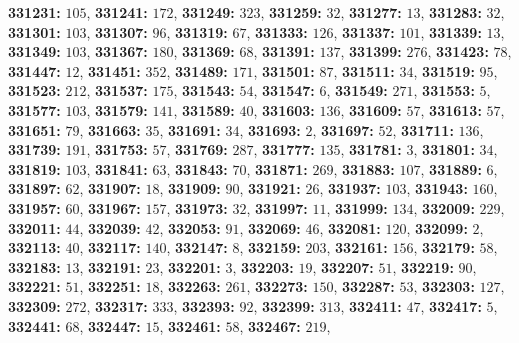 \textsf{\bfseries 331231:} $105$, \textsf{\bfseries 331241:} $172$, \textsf{\bfseries 331249:} $323$, \textsf{\bfseries 331259:} $32$, \textsf{\bfseries 331277:} $13$, \textsf{\bfseries 331283:} $32$, \textsf{\bfseries 331301:} $103$, \textsf{\bfseries 331307:} $96$, \textsf{\bfseries 331319:} $67$, \textsf{\bfseries 331333:} $126$, \textsf{\bfseries 331337:} $101$, \textsf{\bfseries 331339:} $13$, \textsf{\bfseries 331349:} $103$, \textsf{\bfseries 331367:} $180$, \textsf{\bfseries 331369:} $68$, \textsf{\bfseries 331391:} $137$, \textsf{\bfseries 331399:} $276$, \textsf{\bfseries 331423:} $78$, \textsf{\bfseries 331447:} $12$, \textsf{\bfseries 331451:} $352$, \textsf{\bfseries 331489:} $171$, \textsf{\bfseries 331501:} $87$, \textsf{\bfseries 331511:} $34$, \textsf{\bfseries 331519:} $95$, \textsf{\bfseries 331523:} $212$, \textsf{\bfseries 331537:} $175$, \textsf{\bfseries 331543:} $54$, \textsf{\bfseries 331547:} $6$, \textsf{\bfseries 331549:} $271$, \textsf{\bfseries 331553:} $5$, \textsf{\bfseries 331577:} $103$, \textsf{\bfseries 331579:} $141$, \textsf{\bfseries 331589:} $40$, \textsf{\bfseries 331603:} $136$, \textsf{\bfseries 331609:} $57$, \textsf{\bfseries 331613:} $57$, \textsf{\bfseries 331651:} $79$, \textsf{\bfseries 331663:} $35$, \textsf{\bfseries 331691:} $34$, \textsf{\bfseries 331693:} $2$, \textsf{\bfseries 331697:} $52$, \textsf{\bfseries 331711:} $136$, \textsf{\bfseries 331739:} $191$, \textsf{\bfseries 331753:} $57$, \textsf{\bfseries 331769:} $287$, \textsf{\bfseries 331777:} $135$, \textsf{\bfseries 331781:} $3$, \textsf{\bfseries 331801:} $34$, \textsf{\bfseries 331819:} $103$, \textsf{\bfseries 331841:} $63$, \textsf{\bfseries 331843:} $70$, \textsf{\bfseries 331871:} $269$, \textsf{\bfseries 331883:} $107$, \textsf{\bfseries 331889:} $6$, \textsf{\bfseries 331897:} $62$, \textsf{\bfseries 331907:} $18$, \textsf{\bfseries 331909:} $90$, \textsf{\bfseries 331921:} $26$, \textsf{\bfseries 331937:} $103$, \textsf{\bfseries 331943:} $160$, \textsf{\bfseries 331957:} $60$, \textsf{\bfseries 331967:} $157$, \textsf{\bfseries 331973:} $32$, \textsf{\bfseries 331997:} $11$, \textsf{\bfseries 331999:} $134$, \textsf{\bfseries 332009:} $229$, \textsf{\bfseries 332011:} $44$, \textsf{\bfseries 332039:} $42$, \textsf{\bfseries 332053:} $91$, \textsf{\bfseries 332069:} $46$, \textsf{\bfseries 332081:} $120$, \textsf{\bfseries 332099:} $2$, \textsf{\bfseries 332113:} $40$, \textsf{\bfseries 332117:} $140$, \textsf{\bfseries 332147:} $8$, \textsf{\bfseries 332159:} $203$, \textsf{\bfseries 332161:} $156$, \textsf{\bfseries 332179:} $58$, \textsf{\bfseries 332183:} $13$, \textsf{\bfseries 332191:} $23$, \textsf{\bfseries 332201:} $3$, \textsf{\bfseries 332203:} $19$, \textsf{\bfseries 332207:} $51$, \textsf{\bfseries 332219:} $90$, \textsf{\bfseries 332221:} $51$, \textsf{\bfseries 332251:} $18$, \textsf{\bfseries 332263:} $261$, \textsf{\bfseries 332273:} $150$, \textsf{\bfseries 332287:} $53$, \textsf{\bfseries 332303:} $127$, \textsf{\bfseries 332309:} $272$, \textsf{\bfseries 332317:} $333$, \textsf{\bfseries 332393:} $92$, \textsf{\bfseries 332399:} $313$, \textsf{\bfseries 332411:} $47$, \textsf{\bfseries 332417:} $5$, \textsf{\bfseries 332441:} $68$, \textsf{\bfseries 332447:} $15$, \textsf{\bfseries 332461:} $58$, \textsf{\bfseries 332467:} $219$, 
